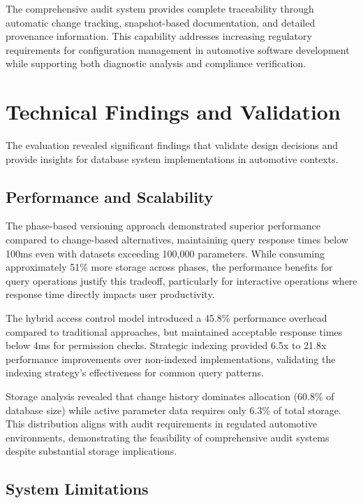The comprehensive audit system provides complete traceability through automatic change tracking, snapshot-based documentation, and detailed provenance information. This capability addresses increasing regulatory requirements for configuration management in automotive software development while supporting both diagnostic analysis and compliance verification.

\section{Technical Findings and Validation}
\label{sec:technical-findings}

The evaluation revealed significant findings that validate design decisions and provide insights for database system implementations in automotive contexts.

\subsection{Performance and Scalability}
\label{subsec:performance-scalability}

The phase-based versioning approach demonstrated superior performance compared to change-based alternatives, maintaining query response times below 100ms even with datasets exceeding 100,000 parameters. While consuming approximately 51\% more storage across phases, the performance benefits for query operations justify this tradeoff, particularly for interactive operations where response time directly impacts user productivity.

The hybrid access control model introduced a 45.8\% performance overhead compared to traditional approaches, but maintained acceptable response times below 4ms for permission checks. Strategic indexing provided 6.5x to 21.8x performance improvements over non-indexed implementations, validating the indexing strategy's effectiveness for common query patterns.

Storage analysis revealed that change history dominates allocation (60.8\% of database size) while active parameter data requires only 6.3\% of total storage. This distribution aligns with audit requirements in regulated automotive environments, demonstrating the feasibility of comprehensive audit systems despite substantial storage implications.

\subsection{System Limitations}
\label{subsec:system-limitations}

